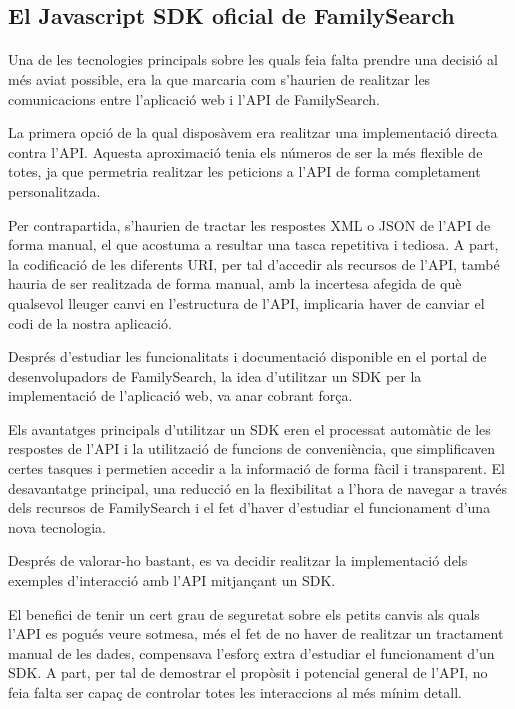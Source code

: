 \subsection{El Javascript SDK oficial de FamilySearch}

    \paragraph{}
    Una de les tecnologies principals sobre les quals feia falta prendre una decisió al més aviat possible, era la que marcaria com s'haurien de realitzar les comunicacions entre l’aplicació web i l’API de FamilySearch.

    La primera opció de la qual disposàvem era realitzar una implementació directa contra l’API. Aquesta aproximació tenia els números de ser la més flexible de totes, ja que permetria realitzar les peticions a l’API de forma completament personalitzada.

    Per contrapartida, s'haurien de tractar les respostes XML o JSON de l’API de forma manual, el que acostuma a resultar una tasca repetitiva i tediosa. A part, la codificació de les diferents URI, per tal d’accedir als recursos de l’API, també hauria de ser realitzada de forma manual, amb la incertesa afegida de què qualsevol lleuger canvi en l’estructura de l’API, implicaria haver de canviar el codi de la nostra aplicació.

    Després d'estudiar les funcionalitats i documentació disponible en el portal de desenvolupadors de FamilySearch, la idea d'utilitzar un SDK per la implementació de l’aplicació web, va anar cobrant força.

    Els avantatges principals d’utilitzar un SDK eren el processat automàtic de les respostes de l’API i la utilització de funcions de conveniència, que simplificaven certes tasques i permetien accedir a la informació de forma fàcil i transparent. El desavantatge principal, una reducció en la flexibilitat a l'hora de navegar a través dels recursos de FamilySearch i el fet d’haver d'estudiar el funcionament d’una nova tecnologia.

    Després de valorar-ho bastant, es va decidir realitzar la implementació dels exem\-ples d'interacció amb l’API mitjançant un SDK.

    El benefici de tenir un cert grau de seguretat sobre els petits canvis als quals l’API es pogués veure sotmesa, més el fet de no haver de realitzar un tractament manual de les dades, compensava l'esforç extra d'estudiar el funcionament d'un SDK. A part, per tal de demostrar el propòsit i potencial general de l’API, no feia falta ser capaç de controlar totes les interaccions al més mínim detall.

